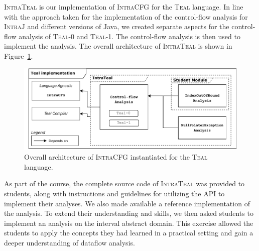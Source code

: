 \textsc{IntraTeal} is our implementation of \textsc{IntraCFG} for the \textsc{Teal} language.
In line with the approach taken for the implementation of the control-flow analysis for \textsc{IntraJ}
and different versions of Java, we created separate aspects for the
control-flow analysis of \textsc{Teal}-0 and \textsc{Teal}-1.  The control-flow analysis is then
used to implement the  analysis. The overall architecture of \textsc{IntraTeal} is
shown in Figure~\ref{fig:IntraTeal}.
\begin{figure}[H]
    \centering
    \includegraphics[scale=0.65]{kappa/img/architectureteal.pdf}
    \caption{\label{fig:IntraTeal} Overall architecture of \textsc{IntraCFG} instantiated for the \textsc{Teal} language.}
\end{figure}

As part of the course, the complete source code of \textsc{IntraTeal} was provided
to students, along with instructions and guidelines for utilizing the API to implement
their analyses. We also made available a reference implementation of the 
analysis. To extend their understanding and skills, we then asked students to implement
an  analysis on the interval abstract domain. This exercise allowed the
students to apply the concepts they had learned in a practical setting and gain a
deeper understanding of dataflow analysis.


